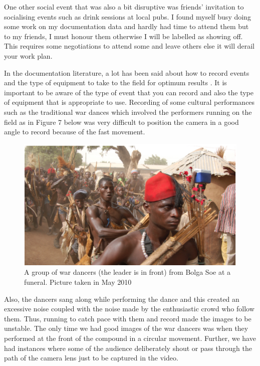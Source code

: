 \documentclass[output=paper,colorlinks,citecolor=brown]{langscibook}
\begin{document}
One other social event that was also a bit disruptive was friends’ invitation to socialising events such as drink sessions at local pubs. I found myself busy doing some work on my documentation data and hardly had time to attend them but to my friends, I must honour them otherwise I will be labelled as showing off.  This requires some negotiations to attend some and leave others else it will derail your work plan.

In the documentation literature, a lot has been said about how to record events and the type of equipment to take to the field for optimum results \citep{Bowern2015, Woodbury2003, AustinGrenoble2007}.  It is important to be aware of the type of event that you can record and also the type of equipment that is appropriate to use. Recording of some cultural performances such as the traditional war dances which involved the performers running on the field as in Figure 7 below was very difficult to position the camera in a good angle to record because of the fast movement.  

\begin{figure}
\includegraphics[scale=0.55]{../figures/bolga_soe.png}
\caption{A group of war dancers (the leader is in front) from Bolga Soe at a funeral. Picture taken in May 2010}
\end{figure}


Also, the dancers sang along while performing the dance and this created an excessive noise coupled with the noise made by the enthusiastic crowd who follow them. Thus, running to catch pace with them and record made the images to be unstable. The only time we had good images of the war dancers was when they performed at the front of the compound in a circular movement. Further, we have had instances where some of the audience deliberately shout or pass through the path of the camera lens just to be captured in the video.
\end{document}
